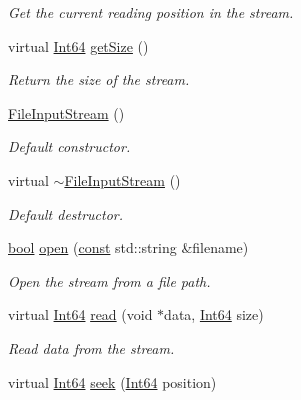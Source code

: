 \begin{DoxyCompactItemize}
\begin{DoxyCompactList}\small\item\em Get the current reading position in the stream. \end{DoxyCompactList}\item 
virtual \hyperlink{namespacesf_a2840579fed3494d9f330baf7a5a19903}{Int64} \hyperlink{classsf_1_1_file_input_stream_aabdcaa315e088e008eeb9711ecc796e8}{get\-Size} ()
\begin{DoxyCompactList}\small\item\em Return the size of the stream. \end{DoxyCompactList}\item 
\hyperlink{classsf_1_1_file_input_stream_a9a321e273f41ff7f187899061fcae9be}{File\-Input\-Stream} ()
\begin{DoxyCompactList}\small\item\em Default constructor. \end{DoxyCompactList}\item 
virtual \hyperlink{classsf_1_1_file_input_stream_ad49ae2025ff2183f80067943a7d0276d}{$\sim$\-File\-Input\-Stream} ()
\begin{DoxyCompactList}\small\item\em Default destructor. \end{DoxyCompactList}\item 
\hyperlink{term__entry_8h_a002004ba5d663f149f6c38064926abac}{bool} \hyperlink{classsf_1_1_file_input_stream_a87a95dc3a71746097a99c86ee58bb353}{open} (\hyperlink{term__entry_8h_a57bd63ce7f9a353488880e3de6692d5a}{const} std\-::string \&filename)
\begin{DoxyCompactList}\small\item\em Open the stream from a file path. \end{DoxyCompactList}\item 
virtual \hyperlink{namespacesf_a2840579fed3494d9f330baf7a5a19903}{Int64} \hyperlink{classsf_1_1_file_input_stream_ad1e94c4152429f485db224c44ee1eb50}{read} (void $\ast$data, \hyperlink{namespacesf_a2840579fed3494d9f330baf7a5a19903}{Int64} size)
\begin{DoxyCompactList}\small\item\em Read data from the stream. \end{DoxyCompactList}\item 
virtual \hyperlink{namespacesf_a2840579fed3494d9f330baf7a5a19903}{Int64} \hyperlink{classsf_1_1_file_input_stream_abdaf5700d4e1de07568e7829106b4eb9}{seek} (\hyperlink{namespacesf_a2840579fed3494d9f330baf7a5a19903}{Int64} position)

\end{DoxyCompactItemize}
